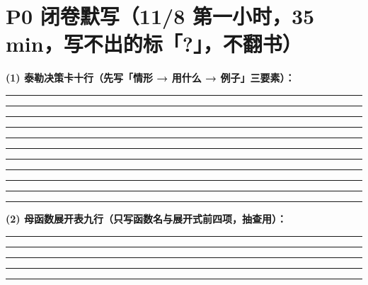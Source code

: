 \documentclass[10pt,a4paper]{ctexart}
\begin{document}
\section*{P0 闭卷默写（11/8 第一小时，35 min，写不出的标「?」，不翻书）}
\textbf{(1) 泰勒决策卡十行（先写「情形 → 用什么 → 例子」三要素）：}
\par\smallskip\noindent\rule{\linewidth}{0.25pt}\par\vspace{0.50cm}
\noindent\rule{\linewidth}{0.25pt}\par\vspace{0.50cm}
\noindent\rule{\linewidth}{0.25pt}\par\vspace{0.50cm}
\noindent\rule{\linewidth}{0.25pt}\par\vspace{0.50cm}
\noindent\rule{\linewidth}{0.25pt}\par\vspace{0.50cm}
\noindent\rule{\linewidth}{0.25pt}\par\vspace{0.50cm}
\noindent\rule{\linewidth}{0.25pt}\par\vspace{0.50cm}
\noindent\rule{\linewidth}{0.25pt}\par\vspace{0.50cm}
\noindent\rule{\linewidth}{0.25pt}\par\vspace{0.50cm}
\noindent\rule{\linewidth}{0.25pt}\par\vspace{0.50cm}
\noindent\rule{\linewidth}{0.25pt}\par\vspace{0.50cm}
\textbf{(2) 母函数展开表九行（只写函数名与展开式前四项，抽查用）：}
\par\smallskip\noindent\rule{\linewidth}{0.25pt}\par\vspace{0.50cm}
\noindent\rule{\linewidth}{0.25pt}\par\vspace{0.50cm}
\noindent\rule{\linewidth}{0.25pt}\par\vspace{0.50cm}
\noindent\rule{\linewidth}{0.25pt}\par\vspace{0.50cm}
\noindent\rule{\linewidth}{0.25pt}\par\vspace{0.50cm}
\end{document}
